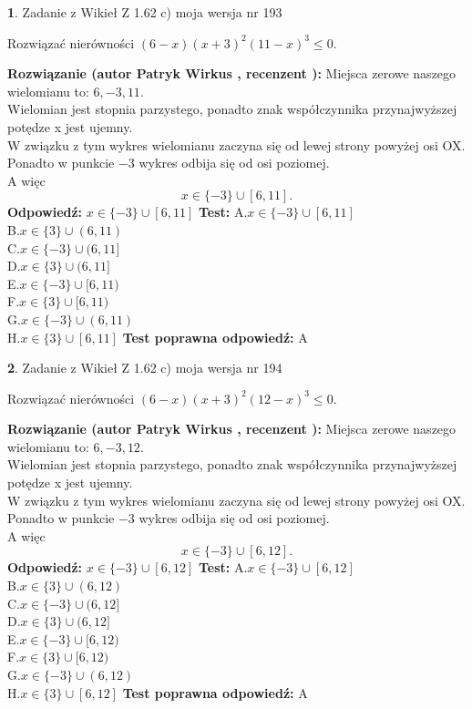 \documentclass[12pt, a4paper]{article}
\theoremstyle{definition} %
\newtheorem{zad}{}
\newcommand{\zadStart}[1]{\begin{zad}#1\newline}
\newcommand{\zadStop}{\end{zad}}
\newcommand{\rozwStart}[2]{\noindent \textbf{Rozwiązanie (autor #1 , recenzent #2): }\newline}
\newcommand{\rozwStop}{\newline}
\newcommand{\odpStart}{\noindent \textbf{Odpowiedź:}\newline}
\newcommand{\odpStop}{\newline}
\newcommand{\testStart}{\noindent \textbf{Test:}\newline}
\newcommand{\testStop}{\newline}
\newcommand{\kluczStart}{\noindent \textbf{Test poprawna odpowiedź:}\newline}
\newcommand{\kluczStop}{\newline}
\begin{document}
\zadStart{Zadanie z Wikieł Z 1.62 c) moja wersja nr 193}

Rozwiązać nierówności $(6-x)(x+3)^{2}(11-x)^{3}\le0$.
\zadStop
\rozwStart{Patryk Wirkus}{}
Miejsca zerowe naszego wielomianu to: $6, -3, 11$.\\
Wielomian jest stopnia parzystego, ponadto znak współczynnika przy\linebreak najwyższej potędze x jest ujemny.\\ W związku z tym wykres wielomianu zaczyna się od lewej strony powyżej osi OX.\\
Ponadto w punkcie $-3$ wykres odbija się od osi poziomej.\\
A więc $$x \in \{-3\} \cup [6,11].$$
\rozwStop
\odpStart
$x \in \{-3\} \cup [6,11]$
\odpStop
\testStart
A.$x \in \{-3\} \cup [6,11]$\\
B.$x \in \{3\} \cup (6,11)$\\
C.$x \in \{-3\} \cup (6,11]$\\
D.$x \in \{3\} \cup (6,11]$\\
E.$x \in \{-3\} \cup [6,11)$\\
F.$x \in \{3\} \cup [6,11)$\\
G.$x \in \{-3\} \cup (6,11)$\\
H.$x \in \{3\} \cup [6,11]$
\testStop
\kluczStart
A
\kluczStop



\zadStart{Zadanie z Wikieł Z 1.62 c) moja wersja nr 194}

Rozwiązać nierówności $(6-x)(x+3)^{2}(12-x)^{3}\le0$.
\zadStop
\rozwStart{Patryk Wirkus}{}
Miejsca zerowe naszego wielomianu to: $6, -3, 12$.\\
Wielomian jest stopnia parzystego, ponadto znak współczynnika przy\linebreak najwyższej potędze x jest ujemny.\\ W związku z tym wykres wielomianu zaczyna się od lewej strony powyżej osi OX.\\
Ponadto w punkcie $-3$ wykres odbija się od osi poziomej.\\
A więc $$x \in \{-3\} \cup [6,12].$$
\rozwStop
\odpStart
$x \in \{-3\} \cup [6,12]$
\odpStop
\testStart
A.$x \in \{-3\} \cup [6,12]$\\
B.$x \in \{3\} \cup (6,12)$\\
C.$x \in \{-3\} \cup (6,12]$\\
D.$x \in \{3\} \cup (6,12]$\\
E.$x \in \{-3\} \cup [6,12)$\\
F.$x \in \{3\} \cup [6,12)$\\
G.$x \in \{-3\} \cup (6,12)$\\
H.$x \in \{3\} \cup [6,12]$
\testStop
\kluczStart
A
\kluczStop
\end{document}
